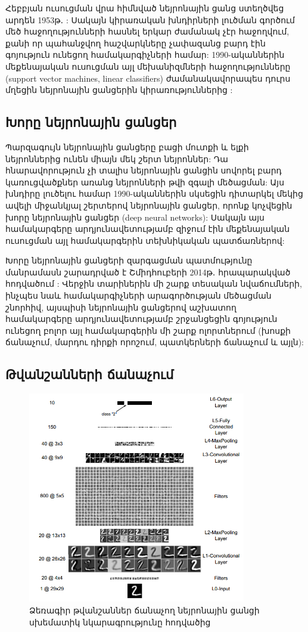 \documentclass[12pt,final]{amsproc}
\begin{document}
Հեբբյան ուսուցման վրա հիմնված նեյրոնային ցանց ստեղծվեց արդեն 1953թ․ \cite{FarleyClark1954}: Սակայն կիրառական խնդիրների լուծման գործում մեծ հաջողությունների հասնել երկար ժամանակ չէր հաջողվում, քանի որ պահանջվող հաշվարկները չափազանց բարդ էին գոյություն ունեցող համակարգիչների համար: 1990-ականներին մեքենայական ուսուցման այլ մեխանիզմների հաջողությունները (support vector machines, linear classifiers) ժամանակավորապես դուրս մղեցին նեյրոնային ցանցերին կիրառություններից \cite{WikiANN}:

\subsection{Խորը նեյրոնային ցանցեր}
Պարզագույն նեյրոնային ցանցերը բացի մուտքի և ելքի նեյրոններից ունեն միայն մեկ շերտ նեյրոններ: Դա հնարավորություն չի տալիս նեյրոնային ցանցին սովորել բարդ կառուցվածքներ առանց նեյրոնների թվի զգալի մեծացման: Այս խնդիրը լուծելու համար 1990-ականներին սկսեցին դիտարկել մեկից ավելի միջանկյալ շերտերով նեյրոնային ցանցեր, որոնք կոչվեցին խորը նեյրոնային ցանցեր (deep neural networks): Սակայն այս համակարգերը արդյունավետությամբ զիջում էին մեքենայական ուսուցման այլ համակարգերին տեխնիկական պատճառներով: 

Խորը նեյրոնային ցանցերի զարգացման պատմությունը մանրամասն շարադրված է Շմիդհուբերի 2014թ․ հրապարակված հոդվածում \cite{DBLP:journals/corr/Schmidhuber14}: Վերջին տարիներին մի շարք տեսական նվաճումների, ինչպես նաև համակարգիչների արագործության մեծացման շնորհիվ, այսպիսի նեյրոնային ցանցերով աշխատող համակարգերը արդյունավետությամբ շրջանցեցին գոյություն ունեցող բոլոր այլ համակարգերին մի շարք ոլորտներում (խոսքի ճանաչում, մարդու դիրքի որոշում, պատկերների ճանաչում և այլն):

\subsection{Թվանշանների ճանաչում}

\begin{figure}[b!]
\centering
\includegraphics[width=0.85\textwidth]{mnist-dnn.png}
\caption{Ձեռագիր թվանշաններ ճանաչող նեյրոնային ցանցի սխեմատիկ նկարագրությունը \cite{MNIST023} հոդվածից}
\label{MNIST-DNN}
\end{figure}
\end{document}
